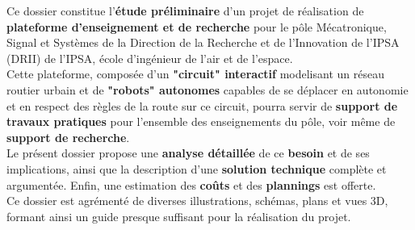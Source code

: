 Ce dossier constitue l'\textbf{étude préliminaire} d'un projet de réalisation de \textbf{plateforme d'enseignement et de recherche} pour le pôle Mécatronique, Signal et Systèmes de la Direction de la Recherche et de l’Innovation de l’IPSA (DRII) de l'IPSA, école d'ingénieur de l'air et de l'espace.\\

Cette plateforme, composée d'un \textbf{"circuit" interactif} modelisant un réseau routier urbain et de \textbf{"robots" autonomes} capables de se déplacer en autonomie et en respect des règles de la route sur ce circuit, pourra servir de \textbf{support de travaux pratiques} pour l'ensemble des enseignements du pôle, voir même de \textbf{support de recherche}.\\

Le présent dossier propose une \textbf{analyse détaillée} de ce \textbf{besoin} et de ses implications, ainsi que la description d'une \textbf{solution technique} complète et argumentée. Enfin, une estimation des \textbf{coûts} et des \textbf{plannings} est offerte.\\

Ce dossier est agrémenté de diverses illustrations, schémas, plans et vues 3D, formant ainsi un guide presque suffisant pour la réalisation du projet.